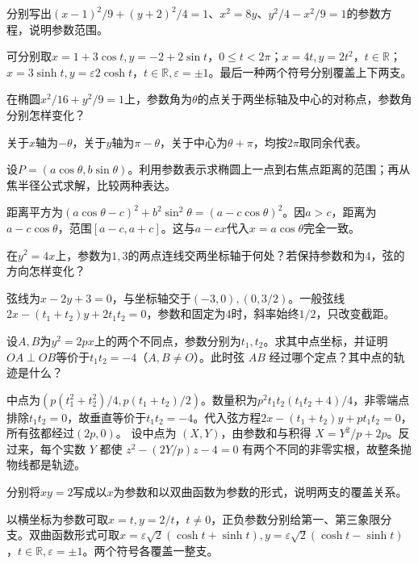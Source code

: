 分别写出\((x-1)^2/9+(y+2)^2/4=1\)、\(x^2=8y\)、\(y^2/4-x^2/9=1\)的参数方程，说明参数范围。
\par
\solutionanswer
可分别取\(x=1+3\cos t,y=-2+2\sin t\)，\(0\le t<2\pi\)；\(x=4t,y=2t^2\)，\(t\in\mathbb R\)；\(x=3\sinh t,y=\varepsilon2\cosh t\)，\(t\in\mathbb R,\varepsilon=\pm1\)。最后一种两个符号分别覆盖上下两支。


在椭圆\(x^2/16+y^2/9=1\)上，参数角为\(\theta\)的点关于两坐标轴及中心的对称点，参数角分别怎样变化？
\par
\solutionanswer
关于\(x\)轴为\(-\theta\)，关于\(y\)轴为\(\pi-\theta\)，关于中心为\(\theta+\pi\)，均按\(2\pi\)取同余代表。


设\(P=(a\cos\theta,b\sin\theta)\)。利用参数表示求椭圆上一点到右焦点距离的范围；再从焦半径公式求解，比较两种表达。
\par
\solutionanswer
距离平方为\((a\cos\theta-c)^2+b^2\sin^2\theta=(a-c\cos\theta)^2\)。因\(a>c\)，距离为\(a-c\cos\theta\)，范围\([a-c,a+c]\)。这与\(a-ex\)代入\(x=a\cos\theta\)完全一致。


在\(y^2=4x\)上，参数为\(1,3\)的两点连线交两坐标轴于何处？若保持参数和为\(4\)，弦的方向怎样变化？
\par
\solutionanswer
弦线为\(x-2y+3=0\)，与坐标轴交于\((-3,0),(0,3/2)\)。一般弦线\(2x-(t_1+t_2)y+2t_1t_2=0\)，参数和固定为\(4\)时，斜率始终\(1/2\)，只改变截距。


设\(A,B\)为\(y^2=2px\)上的两个不同点，参数分别为\(t_1,t_2\)。求其中点坐标，并证明\(OA\perp OB\)等价于\(t_1t_2=-4\)（\(A,B\ne O\)）。此时弦 \(AB\) 经过哪个定点？其中点的轨迹是什么？
\par
\solutionanswer
中点为\((p(t_1^2+t_2^2)/4,p(t_1+t_2)/2)\)。数量积为\(p^2t_1t_2(t_1t_2+4)/4\)，非零端点排除\(t_1t_2=0\)，故垂直等价于\(t_1t_2=-4\)。代入弦方程\(2x-(t_1+t_2)y+pt_1t_2=0\)，所有弦都经过\((2p,0)\)。 设中点为 \((X,Y)\)，由参数和与积得 \(X=Y^2/p+2p\)。反过来，每个实数 \(Y\) 都使 \(z^2-(2Y/p)z-4=0\) 有两个不同的非零实根，故整条抛物线都是轨迹。


分别将\(xy=2\)写成以\(x\)为参数和以双曲函数为参数的形式，说明两支的覆盖关系。
\par
\solutionanswer
以横坐标为参数可取\(x=t,y=2/t\)，\(t\ne0\)，正负参数分别给第一、第三象限分支。双曲函数形式可取\(x=\varepsilon\sqrt2(\cosh t+\sinh t),y=\varepsilon\sqrt2(\cosh t-\sinh t)\)，\(t\in\mathbb R,\varepsilon=\pm1\)。两个符号各覆盖一整支。


